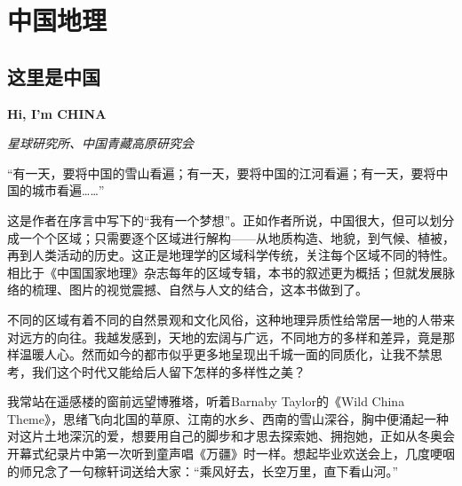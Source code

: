 \section{中国地理}

\subsection*{这里是中国}
\par \textbf{Hi, I’m CHINA}
\par \emph{星球研究所、中国青藏高原研究会} 

\par “有一天，要将中国的雪山看遍；有一天，要将中国的江河看遍；有一天，要将中国的城市看遍……”
\par 这是作者在序言中写下的“我有一个梦想”。正如作者所说，中国很大，但可以划分成一个个区域；只需要逐个区域进行解构——从地质构造、地貌，到气候、植被，再到人类活动的历史。这正是地理学的区域科学传统，关注每个区域不同的特性。相比于《中国国家地理》杂志每年的区域专辑，本书的叙述更为概括；但就发展脉络的梳理、图片的视觉震撼、自然与人文的结合，这本书做到了。
\par 不同的区域有着不同的自然景观和文化风俗，这种地理异质性给常居一地的人带来对远方的向往。我越发感到，天地的宏阔与广远，不同地方的多样和差异，竟是那样温暖人心。然而如今的都市似乎更多地呈现出千城一面的同质化，让我不禁思考，我们这个时代又能给后人留下怎样的多样性之美？
\par 我常站在遥感楼的窗前远望博雅塔，听着Barnaby Taylor的《Wild China Theme》，思绪飞向北国的草原、江南的水乡、西南的雪山深谷，胸中便涌起一种对这片土地深沉的爱，想要用自己的脚步和才思去探索她、拥抱她，正如从冬奥会开幕式纪录片中第一次听到童声唱《万疆》时一样。想起毕业欢送会上，几度哽咽的师兄念了一句稼轩词送给大家：“乘风好去，长空万里，直下看山河。”
\par {}
\par {}


